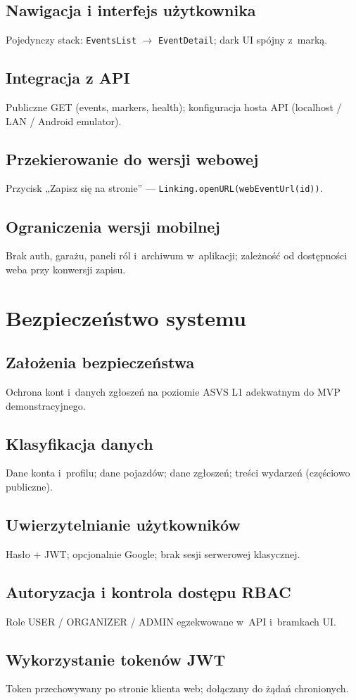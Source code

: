 \documentclass{sprz}
\begin{document}
\section{Nawigacja i interfejs użytkownika}
Pojedynczy stack: \texttt{EventsList} $\rightarrow$ \texttt{EventDetail}; dark UI spójny z~marką.
\section{Integracja z API}
Publiczne GET (events, markers, health); konfiguracja hosta API (localhost / LAN / Android emulator).
\section{Przekierowanie do wersji webowej}
Przycisk „Zapisz się na stronie” --- \texttt{Linking.openURL(webEventUrl(id))}.
\section{Ograniczenia wersji mobilnej}
Brak auth, garażu, paneli ról i~archiwum w~aplikacji; zależność od dostępności weba przy konwersji zapisu.

\chapter{Bezpieczeństwo systemu}
\section{Założenia bezpieczeństwa}
Ochrona kont i~danych zgłoszeń na poziomie ASVS L1 adekwatnym do MVP demonstracyjnego.
\section{Klasyfikacja danych}
Dane konta i~profilu; dane pojazdów; dane zgłoszeń; treści wydarzeń (częściowo publiczne).
\section{Uwierzytelnianie użytkowników}
Hasło + JWT; opcjonalnie Google; brak sesji serwerowej klasycznej.
\section{Autoryzacja i kontrola dostępu RBAC}
Role USER / ORGANIZER / ADMIN egzekwowane w~API i~bramkach UI.
\section{Wykorzystanie tokenów JWT}
Token przechowywany po stronie klienta web; dołączany do żądań chronionych.
\end{document}

